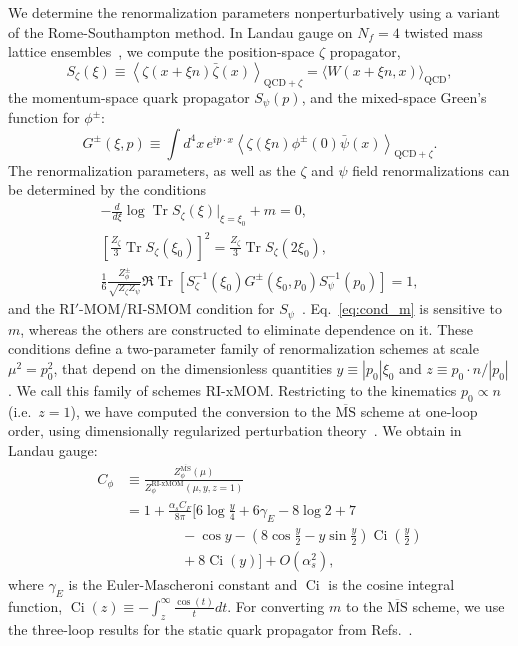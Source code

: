 \documentclass[prl,reprint,notitlepage,nofootinbib]{revtex4-1}
\DeclareMathOperator{\Tr}{Tr}
\DeclareMathOperator{\Ci}{Ci}
\newcommand{\MSbar}{\overline{\text{MS}}}
\begin{document}
We determine the renormalization parameters nonperturbatively using a
variant of the Rome-Southampton method. In Landau gauge on $N_f=4$
twisted mass lattice ensembles~\cite{Alexandrou:2015sea}, we compute
the position-space $\zeta$ propagator,
\begin{equation}
  S_\zeta(\xi) \equiv \left\langle \zeta(x+\xi n)\bar\zeta(x)\right\rangle_{\text{QCD}+\zeta}
  = \bigl\langle W(x+\xi n,x)\bigr\rangle_\text{QCD},
\end{equation}
the momentum-space quark propagator $S_\psi(p)$, and the mixed-space
Green's function for $\phi^\pm$:
\begin{equation}
  G^\pm(\xi,p) \equiv
  \int d^4x\, e^{ip\cdot x}\left\langle
  \zeta(\xi n)\phi^{\pm}(0)\bar\psi(x)\right\rangle_{\text{QCD}+\zeta}.
\end{equation}
The renormalization parameters, as well as the $\zeta$ and $\psi$
field renormalizations can be determined by the conditions
\begin{gather}
  -\frac{d}{d\xi}\log\Tr S_\zeta(\xi)\Bigr|_{\xi=\xi_0} + m=0,\label{eq:cond_m}\\
\left[\frac{Z_\zeta}{3}\Tr S_\zeta(\xi_0)\right]^2=\frac{Z_\zeta}{3}\Tr S_\zeta(2\xi_0),\label{eq:cond_zeta}\\
\frac{1}{6}\frac{Z_\phi^\pm}{\sqrt{Z_\zeta Z_\psi}}\Re\Tr\left[S_\zeta^{-1}(\xi_0)G^\pm(\xi_0,p_0)S_\psi^{-1}(p_0)\right]=1,\label{eq:cond_phi}
\end{gather}
and the RI$'$-MOM/RI-SMOM condition for
$S_\psi$~\cite{Martinelli:1994ty,Sturm:2009kb}. Eq.~\eqref{eq:cond_m}
is sensitive
to $m$, whereas the others are constructed to eliminate dependence on
it.  These conditions define a two-parameter family of renormalization
schemes at scale $\mu^2=p_0^2$, that depend on the dimensionless
quantities $y\equiv|p_0|\xi_0$ and $z\equiv p_0\cdot
n/|p_0|$. We call this family of schemes RI-xMOM.
Restricting to the kinematics $p_0\propto n$ (i.e.\ $z=1$),
we have computed the conversion to the $\MSbar$ scheme at one-loop
order, using dimensionally regularized perturbation
theory~\cite{Green_forthcoming}. We obtain in Landau gauge:
\begin{equation}
\begin{aligned}\label{eq:conversion}
   C_\phi &\equiv \frac{Z_\phi^{\MSbar}(\mu)}{Z_\phi^\text{RI-xMOM}(\mu,y,z=1)} \\
&= 1
+ \frac{\alpha_s C_F}{8\pi}\biggl[
  6\log\frac{y}{4}
  + 6\gamma_E - 8\log 2 + 7 \\
&\qquad\qquad - \cos y - \left(8\cos\frac{y}{2} - y\sin\frac{y}{2}\right)
\Ci\left(\frac{y}{2}\right) \\
&\qquad\qquad + 8\Ci(y)\biggr] + O(\alpha_s^2),
\end{aligned}
\end{equation}
where $\gamma_E$ is the Euler-Mascheroni constant and $\Ci$ is the
cosine integral function, $\Ci(z) \equiv -\int_z^\infty
\frac{\cos(t)}{t} dt$. For converting $m$ to the $\MSbar$ scheme, we
use the three-loop results for the static quark propagator from
Refs.~\cite{Chetyrkin:2003vi,Melnikov:2000zc}.
\end{document}
